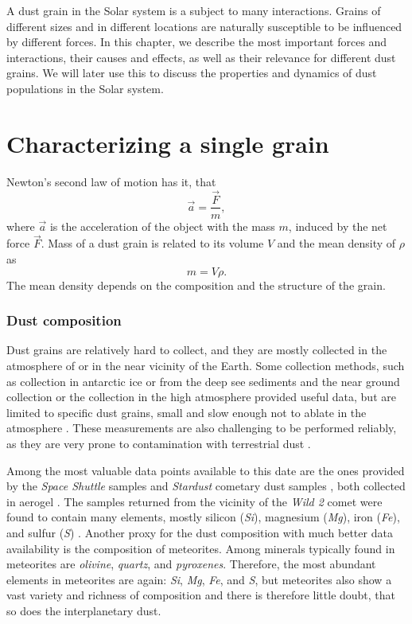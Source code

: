A dust grain in the Solar system is a subject to many interactions. Grains of different sizes and in different locations are naturally susceptible to be influenced by different forces. In this chapter, we describe the most important forces and interactions, their causes and effects, as well as their relevance for different dust grains. We will later use this to discuss the properties and dynamics of dust populations in the Solar system. 

\section{Characterizing a single grain}

Newton's second law of motion has it, that
\begin{equation}
\vec{a} = \frac{\vec{F}}{m},
\end{equation}
where $\vec{a}$ is the acceleration of the object with the mass $m$, induced by the net force $\vec{F}$. Mass of a dust grain is related to its volume $V$ and the mean density of $\rho$ as
\begin{equation}
    m = V \rho.
\end{equation}
The mean density depends on the composition and the structure of the grain. 

\subsubsection{Dust composition}

Dust grains are relatively hard to collect, and they are mostly collected in the atmosphere of or in the near vicinity of the Earth. Some collection methods, such as collection in antarctic ice or from the deep see sediments \citep{brownlee1985cosmic} and the near ground collection \citep{pettersson1958rate} or the collection in the high atmosphere \citep{fechtig1968results} provided useful data, but are limited to specific dust grains, small and slow enough not to ablate in the atmosphere \citep{vondrak2008chemical}. These measurements are also challenging to be performed reliably, as they are very prone to contamination with terrestrial dust \citep{taylor2016cosmic}. 

Among the most valuable data points available to this date are the ones provided by the \textit{Space Shuttle} samples \citep{mcdonnell1984cosmic} and \textit{Stardust} cometary dust samples \citep{brownlee2014stardust}, both collected in aerogel \citep{tsou1995silica}. The samples returned from the vicinity of the \textit{Wild 2} comet were found to contain many elements, mostly silicon (\textit{Si}), magnesium (\textit{Mg}), iron (\textit{Fe}), and sulfur (\textit{S}) \citep{keller2006infrared}. Another proxy for the dust composition with much better data availability is the composition of meteorites. Among minerals typically found in meteorites are \textit{olivine}, \textit{quartz}, and \textit{pyroxenes}. Therefore, the most abundant elements in meteorites are again: \textit{Si}, \textit{Mg}, \textit{Fe}, and \textit{S}, but meteorites also show a vast variety and richness of composition \citep{anders1964origin} and there is therefore little doubt, that so does the interplanetary dust. 

